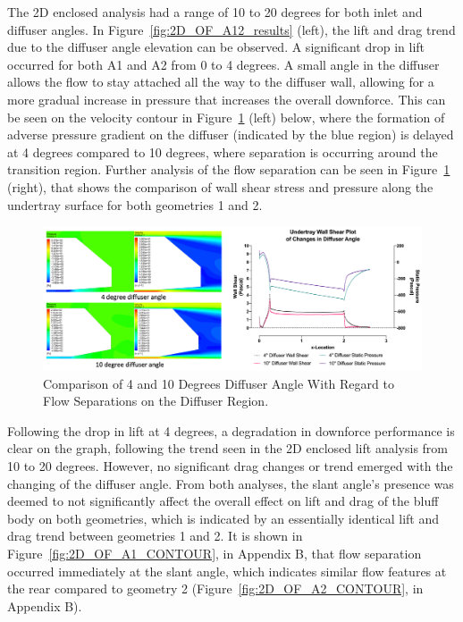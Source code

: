 \noindent The 2D enclosed analysis had a range of 10 to 20 degrees for both inlet and diffuser angles. In Figure~\ref{fig:2D_OF_A12_results} (left), the lift and drag trend due to the diffuser angle elevation can be observed. A significant drop in lift occurred for both A1 and A2 from 0 to 4 degrees. A small angle in the diffuser allows the flow to stay attached all the way to the diffuser wall, allowing for a more gradual increase in pressure that increases the overall downforce. This can be seen on the velocity contour in Figure~\ref{fig:2D_OF_10_4_Contour_compare} (left) below, where the formation of adverse pressure gradient on the diffuser (indicated by the blue region) is delayed at 4 degrees compared to 10 degrees, where separation is occurring around the transition region. Further analysis of the flow separation can be seen in Figure~\ref{fig:2D_OF_10_4_Contour_compare} (right), that shows the comparison of wall shear stress and pressure along the undertray surface for both geometries 1 and 2. 

\begin{figure}[!htb]
    \centering
    \includegraphics[scale=0.52]{Figures/2D_OF/10_4_O_COMPARE CONTOUR.PNG}
    \caption{Comparison of 4 and 10 Degrees Diffuser Angle With Regard to Flow Separations on the Diffuser Region.}
    \label{fig:2D_OF_10_4_Contour_compare}
\end{figure}

\noindent Following the drop in lift at 4 degrees, a degradation in downforce performance is clear on the graph, following the trend seen in the 2D enclosed lift analysis from 10 to 20 degrees. However, no significant drag changes or trend emerged with the changing of the diffuser angle. From both analyses, the slant angle's presence was deemed to not significantly affect the overall effect on lift and drag of the bluff body on both geometries, which is indicated by an essentially identical lift and drag trend between geometries 1 and 2. It is shown in Figure~\ref{fig:2D_OF_A1_CONTOUR}, in Appendix B, that flow separation occurred immediately at the slant angle, which indicates similar flow features at the rear compared to geometry 2 (Figure~\ref{fig:2D_OF_A2_CONTOUR}, in Appendix B). 

